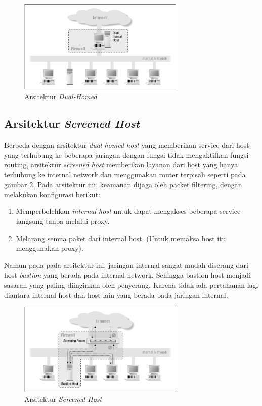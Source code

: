 \begin{figure}[H]
	\centering
	\includegraphics[width=300px]{resources/dual_homed.png}
	\caption{Arsitektur \textit{Dual-Homed}}
	\label{fig:dual_homed}
\end{figure}

\subsection{Arsitektur \textit{Screened Host}}

Berbeda dengan arsitektur \textit{dual-homed host} yang memberikan service dari host yang terhubung ke beberapa jaringan dengan fungsi tidak mengaktifkan fungsi routing, arsitektur \textit{screened host} memberikan layanan dari host yang hanya terhubung ke internal network dan menggunakan router terpisah seperti pada  gambar \ref{fig:screened_host}. Pada arsitektur ini, keamanan dijaga oleh packet filtering, dengan melakukan konfigurasi berikut:

\begin{enumerate}
\item Memperbolehkan \textit{internal host} untuk dapat mengakses beberapa service langsung tanpa melalui proxy.
\item Melarang semua paket dari internal host. (Untuk memaksa host itu menggunakan proxy).
\end{enumerate}

Namun pada pada arsitektur ini, jaringan internal sangat mudah diserang dari host \textit{bastion} yang berada pada internal network. Sehingga bastion host menjadi sasaran yang paling diinginkan oleh penyerang. Karena tidak ada pertahanan lagi diantara internal host dan host lain yang berada pada jaringan internal.

\begin{figure}[H]
	\centering
	\includegraphics[width=300px]{resources/screened_host.png}
	\caption{Arsitektur \textit{Screened Host}}
	\label{fig:screened_host}
\end{figure}

